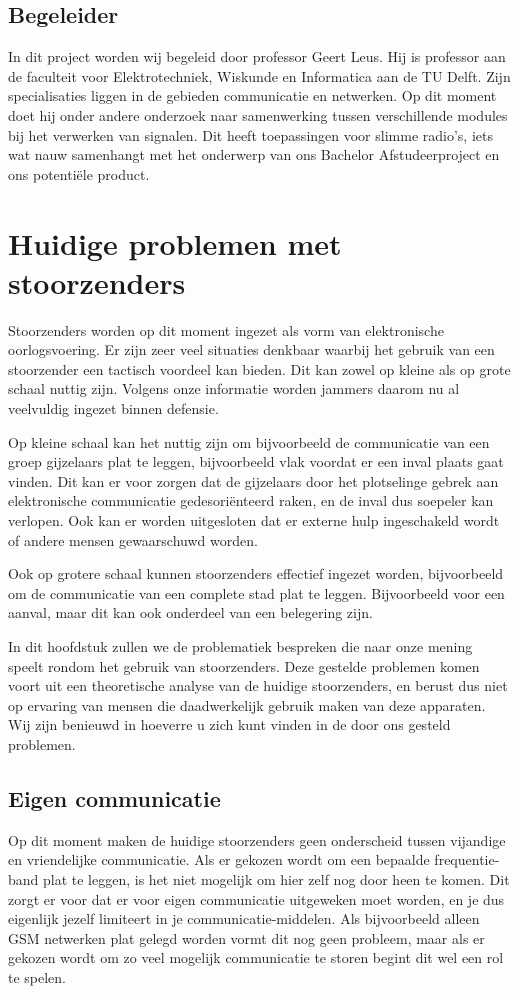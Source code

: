 \documentclass[oneside, a4paper, openany]{memoir}
\begin{document}
\section{Begeleider}
In dit project worden wij begeleid door professor Geert Leus. Hij is professor aan de faculteit voor Elektrotechniek, Wiskunde en Informatica aan de TU Delft. Zijn specialisaties liggen in de gebieden communicatie en netwerken. Op dit moment doet hij onder andere onderzoek naar samenwerking tussen verschillende modules bij het verwerken van signalen. Dit heeft toepassingen voor slimme radio's, iets wat nauw samenhangt met het onderwerp van ons Bachelor Afstudeerproject en ons potentiële product.

\chapter{Huidige problemen met stoorzenders}
Stoorzenders worden op dit moment ingezet als vorm van elektronische oorlogsvoering. Er zijn zeer veel situaties denkbaar waarbij het gebruik van een stoorzender een tactisch voordeel kan bieden. Dit kan zowel op kleine als op grote schaal nuttig zijn. Volgens onze informatie worden jammers daarom nu al veelvuldig ingezet binnen defensie.

Op kleine schaal kan het nuttig zijn om bijvoorbeeld de communicatie van een groep gijzelaars plat te leggen, bijvoorbeeld vlak voordat er een inval plaats gaat vinden. Dit kan er voor zorgen dat de gijzelaars door het plotselinge gebrek aan elektronische communicatie gedesoriënteerd raken, en de inval dus soepeler kan verlopen. Ook kan er worden uitgesloten dat er externe hulp ingeschakeld wordt of andere mensen gewaarschuwd worden.

Ook op grotere schaal kunnen stoorzenders effectief ingezet worden, bijvoorbeeld om de communicatie van een complete stad plat te leggen. Bijvoorbeeld voor een aanval, maar dit kan ook onderdeel van een belegering zijn.

In dit hoofdstuk zullen we de problematiek bespreken die naar onze mening speelt rondom het gebruik van stoorzenders. Deze gestelde problemen komen voort uit een theoretische analyse van de huidige stoorzenders, en berust dus niet op ervaring van mensen die daadwerkelijk gebruik maken van deze apparaten. Wij zijn benieuwd in hoeverre u zich kunt vinden in de door ons gesteld problemen.

\section{Eigen communicatie}
Op dit moment maken de huidige stoorzenders geen onderscheid tussen vijandige en vriendelijke communicatie. Als er gekozen wordt om een bepaalde frequentie-band plat te leggen, is het niet mogelijk om hier zelf nog door heen te komen. Dit zorgt er voor dat er voor eigen communicatie uitgeweken moet worden, en je dus eigenlijk jezelf limiteert in je communicatie-middelen. Als bijvoorbeeld alleen GSM netwerken plat gelegd worden vormt dit nog geen probleem, maar als er gekozen wordt om zo veel mogelijk communicatie te storen begint dit wel een rol te spelen.
\end{document}
